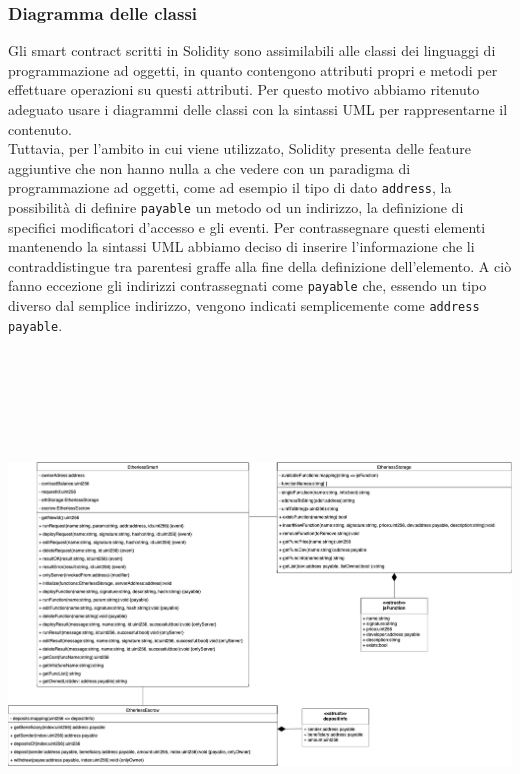 \subsubsection{Diagramma delle classi}
Gli smart contract scritti in Solidity sono assimilabili alle classi dei linguaggi di programmazione ad oggetti, in quanto contengono attributi propri e metodi per effettuare operazioni su questi attributi. Per questo motivo abbiamo ritenuto adeguato usare i diagrammi delle classi con la sintassi UML per rappresentarne il contenuto. \\
Tuttavia, per l'ambito in cui viene utilizzato, Solidity presenta delle feature aggiuntive che non hanno nulla a che vedere con un paradigma di programmazione ad oggetti, come ad esempio il tipo di dato \texttt{address}, la possibilità di definire \texttt{payable} un metodo od un indirizzo, la definizione di specifici modificatori d'accesso e gli eventi. Per contrassegnare questi elementi mantenendo la sintassi UML abbiamo deciso di inserire l'informazione che li contraddistingue tra parentesi graffe alla fine della definizione dell'elemento. A ciò fanno eccezione gli indirizzi contrassegnati come \texttt{payable} che, essendo un tipo diverso dal semplice indirizzo, vengono indicati semplicemente come \texttt{address payable}.
\begin{landscape}
\includegraphics[width=21.5cm, height=14cm]{././diagrammi/etherless-smart/classi/Etherless-smart.jpg}
\end{landscape}
\restoregeometry
